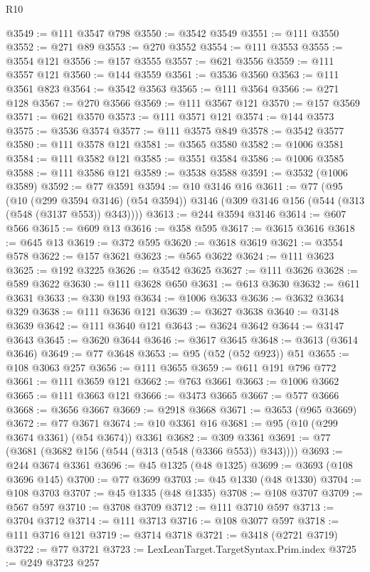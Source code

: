 \begin{lexlean}{R10}
\begin{coremodule}
@3549 := @111 @3547 @798
@3550 := @3542 @3549
@3551 := @111 @3550
@3552 := @271 @89
@3553 := @270 @3552
@3554 := @111 @3553
@3555 := @3554 @121
@3556 := @157 @3555
@3557 := @621 @3556
@3559 := @111 @3557 @121
@3560 := @144 @3559
@3561 := @3536 @3560
@3563 := @111 @3561 @823
@3564 := @3542 @3563
@3565 := @111 @3564
@3566 := @271 @128
@3567 := @270 @3566
@3569 := @111 @3567 @121
@3570 := @157 @3569
@3571 := @621 @3570
@3573 := @111 @3571 @121
@3574 := @144 @3573
@3575 := @3536 @3574
@3577 := @111 @3575 @849
@3578 := @3542 @3577
@3580 := @111 @3578 @121
@3581 := @3565 @3580
@3582 := @1006 @3581
@3584 := @111 @3582 @121
@3585 := @3551 @3584
@3586 := @1006 @3585
@3588 := @111 @3586 @121
@3589 := @3538 @3588
@3591 := @3532 (@1006 @3589)
@3592 := @77 @3591
@3594 := @10 @3146 @16
@3611 := @77
    (@95
      (@10 (@299 @3594 @3146) (@54 @3594))
      @3146
      (@309 @3146 @156 (@544 (@313 (@548 (@3137 @553)) @343))))
@3613 := @244 @3594 @3146
@3614 := @607 @566
@3615 := @609 @13
@3616 := @358 @595
@3617 := @3615 @3616
@3618 := @645 @13
@3619 := @372 @595
@3620 := @3618 @3619
@3621 := @3554 @578
@3622 := @157 @3621
@3623 := @565 @3622
@3624 := @111 @3623
@3625 := @192 @3225
@3626 := @3542 @3625
@3627 := @111 @3626
@3628 := @589 @3622
@3630 := @111 @3628 @650
@3631 := @613 @3630
@3632 := @611 @3631
@3633 := @330 @193
@3634 := @1006 @3633
@3636 := @3632 @3634 @329
@3638 := @111 @3636 @121
@3639 := @3627 @3638
@3640 := @3148 @3639
@3642 := @111 @3640 @121
@3643 := @3624 @3642
@3644 := @3147 @3643
@3645 := @3620 @3644
@3646 := @3617 @3645
@3648 := @3613 (@3614 @3646)
@3649 := @77 @3648
@3653 := @95 (@52 (@52 @923)) @51
@3655 := @108 @3063 @257
@3656 := @111 @3655
@3659 := @611 @191 @796 @772
@3661 := @111 @3659 @121
@3662 := @763 @3661
@3663 := @1006 @3662
@3665 := @111 @3663 @121
@3666 := @3473 @3665
@3667 := @577 @3666
@3668 := @3656 @3667
@3669 := @2918 @3668
@3671 := @3653 (@965 @3669)
@3672 := @77 @3671
@3674 := @10 @3361 @16
@3681 := @95 (@10 (@299 @3674 @3361) (@54 @3674)) @3361
@3682 := @309 @3361
@3691 := @77 (@3681 (@3682 @156 (@544 (@313 (@548 (@3366 @553)) @343))))
@3693 := @244 @3674 @3361
@3696 := @45 @1325 (@48 @1325)
@3699 := @3693 (@108 @3696 @145)
@3700 := @77 @3699
@3703 := @45 @1330 (@48 @1330)
@3704 := @108 @3703
@3707 := @45 @1335 (@48 @1335)
@3708 := @108 @3707
@3709 := @567 @597
@3710 := @3708 @3709
@3712 := @111 @3710 @597
@3713 := @3704 @3712
@3714 := @111 @3713
@3716 := @108 @3077 @597
@3718 := @111 @3716 @121
@3719 := @3714 @3718
@3721 := @3418 (@2721 @3719)
@3722 := @77 @3721
@3723 := LexLeanTarget.TargetSyntax.Prim.index
@3725 := @249 @3723 @257

\end{coremodule}
\end{lexlean}

